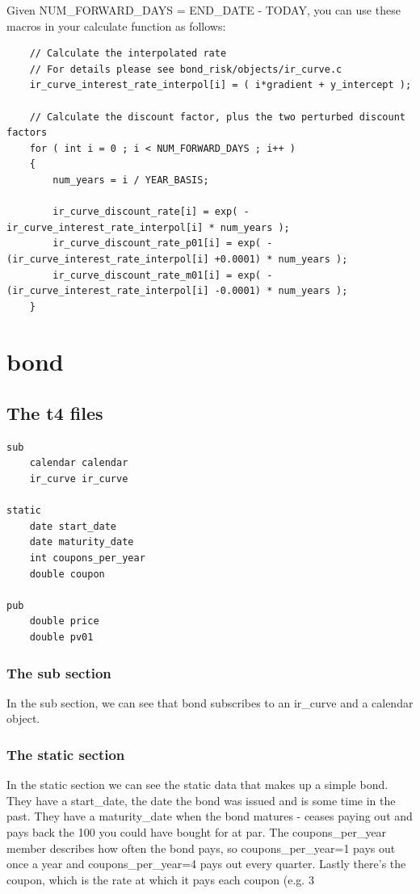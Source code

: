 \documentclass{report}
\begin{document}
Given NUM_FORWARD_DAYS = END_DATE - TODAY, you can use these macros in your calculate function as follows:

\begin{verbatim}
    // Calculate the interpolated rate
    // For details please see bond_risk/objects/ir_curve.c
    ir_curve_interest_rate_interpol[i] = ( i*gradient + y_intercept );

    // Calculate the discount factor, plus the two perturbed discount factors
    for ( int i = 0 ; i < NUM_FORWARD_DAYS ; i++ )
    {
        num_years = i / YEAR_BASIS;

        ir_curve_discount_rate[i] = exp( -ir_curve_interest_rate_interpol[i] * num_years );
        ir_curve_discount_rate_p01[i] = exp( -(ir_curve_interest_rate_interpol[i] +0.0001) * num_years );
        ir_curve_discount_rate_m01[i] = exp( -(ir_curve_interest_rate_interpol[i] -0.0001) * num_years );
    }
\end{verbatim}

\section{bond}

\subsection{The t4 files}

\begin{verbatim}
sub
    calendar calendar
    ir_curve ir_curve

static
    date start_date
    date maturity_date
    int coupons_per_year
    double coupon

pub
    double price
    double pv01
\end{verbatim}

\subsubsection{The sub section}

In the sub section, we can see that bond subscribes to an ir_curve and a calendar object.

\subsubsection{The static section}

In the static section we can see the static data that makes up a simple bond. They have a start_date, the date the bond was issued and is some time in the past. They have a maturity_date when the bond matures - ceases paying out and pays back the 100 you could have bought for at par. The coupons_per_year member describes how often the bond pays, so coupons_per_year=1 pays out once a year and coupons_per_year=4 pays out every quarter. Lastly there's the coupon, which is the rate at which it pays each coupon (e.g. 3%
\end{document}
